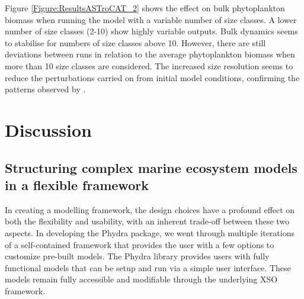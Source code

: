\documentclass[journal abbreviation, manuscript]{copernicus}
\begin{document}
Figure \ref{Figure:ResultsASTroCAT_2} shows the effect on bulk phytoplankton biomass when running the model with a variable number of size classes. A lower number of size classes (2-10) show highly variable outputs. Bulk dynamics seems to stabilise for numbers of size classes above 10. However, there are still deviations between runs in relation to the average phytoplankton biomass when more than 10 size classes are considered. The increased size resolution seems to reduce the perturbations carried on from initial model conditions, confirming the patterns observed by \citet{Baird2010IncreasingErrors}.


\section{Discussion}

\subsection{Structuring complex marine ecosystem models in a flexible framework}

In creating a modelling framework, the design choices have a profound effect on both the flexibility and usability, with an inherent trade-off between these two aspects. In developing the Phydra package, we went through multiple iterations of a self-contained framework that provides the user with a few options to customize pre-built models. The Phydra library provides users with fully functional models that can be setup and run via a simple user interface. These models remain fully accessible and modifiable through the underlying XSO framework.
\end{document}
